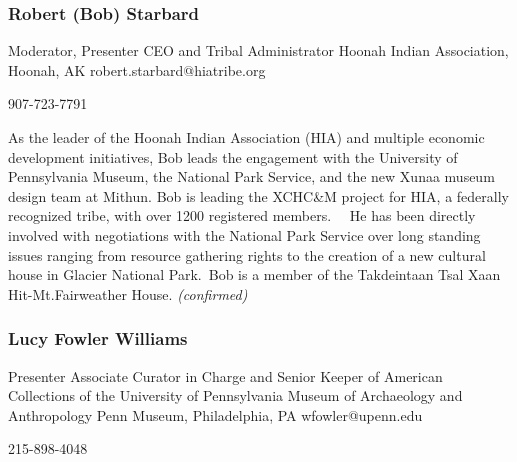 \documentclass{report}
\begin{document}
                \subsubsection*{ Robert (Bob)  Starbard }
                Moderator, Presenter\newline
                CEO and Tribal Administrator\newline
                Hoonah Indian Association, Hoonah, AK
                \newline
                robert.starbard@hiatribe.org\newline
                
                907-723-7791\newline

                As the leader of the Hoonah Indian Association (HIA) and multiple economic development initiatives, Bob leads the engagement with the University of Pennsylvania Museum, the National Park Service, and the new Xunaa museum design team at Mithun. Bob is leading the XCHC\&M project for HIA, a federally recognized tribe, with over 1200 registered members. 
 He has been directly involved with negotiations with the National Park Service over long standing issues ranging from resource gathering rights to the creation of a new cultural house in Glacier National Park. Bob is a member of the Takdeintaan Tsal Xaan Hit-Mt.Fairweather House.\newline
                \emph{ (confirmed) }
              

              
                \subsubsection*{ Lucy  Fowler Williams  }
                Presenter\newline
                Associate Curator in Charge and Senior Keeper of American Collections of the University of Pennsylvania Museum of Archaeology and Anthropology\newline
                Penn Museum, Philadelphia, PA
                \newline
                wfowler@upenn.edu\newline
                
                215-898-4048\newline
\end{document}
